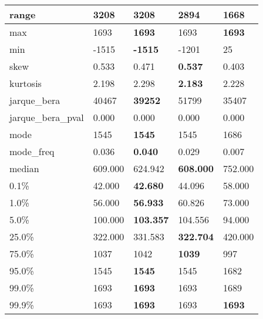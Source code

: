 \begin{table}[H]
\begin{tabular}{|l|m{10em}|m{10em}|m{10em}|m{10em}|}
\hline range & 3208 & \bfseries 3208 & 2894 & \cellcolor[rgb]{0.9, 0.54, 0.52} 1668 \\
\hline max & 1693 & \bfseries 1693 & \cellcolor[rgb]{0.9, 0.54, 0.52} 1693 & \bfseries 1693 \\
\hline min & -1515 & \bfseries -1515 & -1201 & \cellcolor[rgb]{0.9, 0.54, 0.52} 25 \\
\hline skew & 0.533 & 0.471 & \bfseries 0.537 & \cellcolor[rgb]{0.9, 0.54, 0.52} 0.403 \\
\hline kurtosis & 2.198 & \cellcolor[rgb]{0.9, 0.54, 0.52} 2.298 & \bfseries 2.183 & 2.228 \\
\hline jarque\_bera & 40467 & \bfseries 39252 & \cellcolor[rgb]{0.9, 0.54, 0.52} 51799 & 35407 \\
\hline jarque\_bera\_pval & 0.000 & 0.000 & 0.000 & 0.000 \\
\hline mode & 1545 & \bfseries 1545 & 1545 & \cellcolor[rgb]{0.9, 0.54, 0.52} 1686 \\
\hline mode\_freq & 0.036 & \bfseries 0.040 & 0.029 & \cellcolor[rgb]{0.9, 0.54, 0.52} 0.007 \\
\hline median & 609.000 & 624.942 & \bfseries 608.000 & \cellcolor[rgb]{0.9, 0.54, 0.52} 752.000 \\
\hline 0.1\% & 42.000 & \bfseries 42.680 & 44.096 & \cellcolor[rgb]{0.9, 0.54, 0.52} 58.000 \\
\hline 1.0\% & 56.000 & \bfseries 56.933 & 60.826 & \cellcolor[rgb]{0.9, 0.54, 0.52} 73.000 \\
\hline 5.0\% & 100.000 & \bfseries 103.357 & 104.556 & \cellcolor[rgb]{0.9, 0.54, 0.52} 94.000 \\
\hline 25.0\% & 322.000 & 331.583 & \bfseries 322.704 & \cellcolor[rgb]{0.9, 0.54, 0.52} 420.000 \\
\hline 75.0\% & 1037 & 1042 & \bfseries 1039 & \cellcolor[rgb]{0.9, 0.54, 0.52} 997 \\
\hline 95.0\% & 1545 & \bfseries 1545 & 1545 & \cellcolor[rgb]{0.9, 0.54, 0.52} 1682 \\
\hline 99.0\% & 1693 & \bfseries 1693 & 1693 & \cellcolor[rgb]{0.9, 0.54, 0.52} 1689 \\
\hline 99.9\% & 1693 & \bfseries 1693 & \cellcolor[rgb]{0.9, 0.54, 0.52} 1693 & \bfseries 1693 \\
\hline
\end{tabular}
\end{table}
